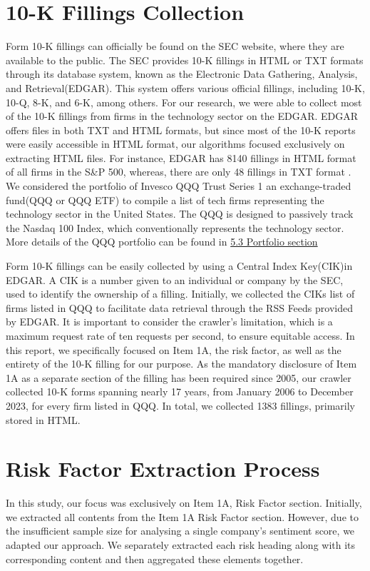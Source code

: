 \documentclass[logo,bsc,singlespacing,parskip]{infthesis}
\begin{document}
\section{10-K Fillings Collection}
Form 10-K fillings can officially be found on the SEC website, where they are available to the public. The SEC provides 10-K fillings in HTML or TXT formats through its database system, known as the Electronic Data Gathering, Analysis, and Retrieval(EDGAR). This system offers various official fillings, including 10-K, 10-Q, 8-K, and 6-K, among others. For our research, we were able to collect most of the 10-K fillings from firms in the technology sector on the EDGAR. EDGAR offers files in both TXT and HTML formats, but since most of the 10-K reports were easily accessible in HTML format, our algorithms focused exclusively on extracting HTML files. For instance, EDGAR has 8140 fillings in HTML format of all firms in the S&P 500, whereas, there are only 48 fillings in TXT format \cite{Sha2023}. We considered the portfolio of Invesco QQQ Trust Series 1 an exchange-traded fund(QQQ or QQQ ETF) to compile a list of tech firms representing the technology sector in the United States. The QQQ is designed to passively track the Nasdaq 100 Index, which conventionally represents the technology sector. More details of the QQQ portfolio can be found in \hyperref[portfolio]{5.3 Portfolio section} 

Form 10-K fillings can be easily collected by using a Central Index Key(CIK)in EDGAR. A CIK is a number given to an individual or company by the SEC, used to identify the ownership of a filling. Initially, we collected the CIKs list of firms listed in QQQ to facilitate data retrieval through the RSS Feeds provided by EDGAR. It is important to consider the crawler’s limitation, which is a maximum request rate of ten requests per second, to ensure equitable access. In this report, we specifically focused on Item 1A, the risk factor, as well as the entirety of the 10-K filling for our purpose. As the mandatory disclosure of Item 1A as a separate section of the filling has been required since 2005, our crawler collected 10-K forms spanning nearly 17 years, from January 2006 to December 2023, for every firm listed in QQQ. In total, we collected 1383 fillings, primarily stored in HTML.


\section{Risk Factor Extraction Process}
In this study, our focus was exclusively on Item 1A, Risk Factor section. Initially, we extracted all contents from the Item 1A Risk Factor section. However, due to the insufficient sample size for analysing a single company’s sentiment score, we adapted our approach. We separately extracted each risk heading along with its corresponding content and then aggregated these elements together.
\end{document}
